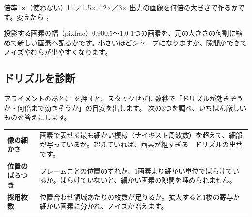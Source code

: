 
\begin{setting}{ 倍率}{1×（使わない）}{1×／1.5×／2×／3×}
  出力の画像を何倍の大きさで作るかです。変えたら 。
\end{setting}

\begin{setting}{ 投影する画素の幅（pixfrac）}{0.90}{0.5〜1.0}
  1つの画素を、元の大きさの何割に縮めて新しい画素へ配るかです。小さいほどシャープになりますが、隙間ができてノイズやむらが出やすくなります。
\end{setting}

\subsection*{ ドリズルを診断}

アライメントのあとに  を押すと、スタックせずに数秒で「ドリズルが効きそうか・何倍まで効きそうか」の目安を出します。
次の3つを調べ、いちばん厳しいものを答えにします。

\begin{center}\small
\begin{tabularx}{0.95\linewidth}{@{}>{\sffamily\bfseries}l X@{}}
\toprule
像の細かさ & 画素で表せる最も細かい模様（ナイキスト周波数）を超えて、細部が写っているか。超えていれば、画素が粗すぎる＝ドリズルの出番です。\\
位置のばらつき & フレームごとの位置のずれが、1画素より細かい単位でばらけているか。ばらけていないと、細かい画素の隙間を埋められません。\\
採用枚数 & 位置合わせ領域あたりの枚数が足りるか。拡大すると1枚の寄与が細かい画素に分かれ、ノイズが増えます。\\
\bottomrule
\end{tabularx}
\end{center}

